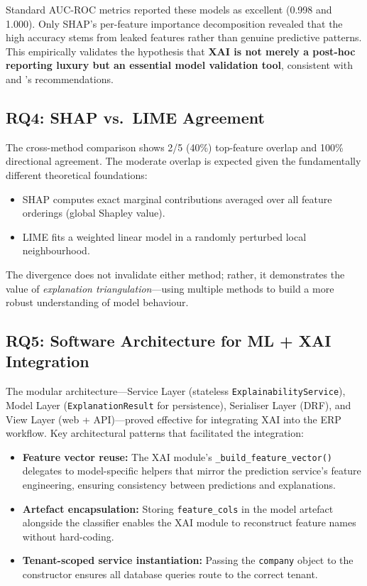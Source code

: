 \documentclass[12pt,a4paper]{report}
\begin{document}
Standard AUC-ROC metrics reported these models as excellent (0.998 and 1.000). Only SHAP's per-feature importance decomposition revealed that the high accuracy stems from leaked features rather than genuine predictive patterns. This empirically validates the hypothesis that \textbf{XAI is not merely a post-hoc reporting luxury but an essential model validation tool}, consistent with \citet{lundberg2020local} and \citet{molnar2022interpretable}'s recommendations.

\subsection{RQ4: SHAP vs.\ LIME Agreement}

The cross-method comparison shows 2/5 (40\%) top-feature overlap and 100\% directional agreement. The moderate overlap is expected given the fundamentally different theoretical foundations:

\begin{itemize}
  \item SHAP computes exact marginal contributions averaged over all feature orderings (global Shapley value).
  \item LIME fits a weighted linear model in a randomly perturbed local neighbourhood.
\end{itemize}

The divergence does not invalidate either method; rather, it demonstrates the value of \textit{explanation triangulation}---using multiple methods to build a more robust understanding of model behaviour.

\subsection{RQ5: Software Architecture for ML + XAI Integration}

The modular architecture---Service Layer (stateless \texttt{ExplainabilityService}), Model Layer (\texttt{ExplanationResult} for persistence), Serialiser Layer (DRF), and View Layer (web + API)---proved effective for integrating XAI into the ERP workflow. Key architectural patterns that facilitated the integration:

\begin{itemize}
  \item \textbf{Feature vector reuse:} The XAI module's \texttt{\_build\_feature\_vector()} delegates to model-specific helpers that mirror the prediction service's feature engineering, ensuring consistency between predictions and explanations.
  \item \textbf{Artefact encapsulation:} Storing \texttt{feature\_cols} in the model artefact alongside the classifier enables the XAI module to reconstruct feature names without hard-coding.
  \item \textbf{Tenant-scoped service instantiation:} Passing the \texttt{company} object to the constructor ensures all database queries route to the correct tenant.
\end{itemize}
\end{document}
